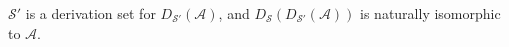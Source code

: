 $\mathcal{S}'$ is a derivation set for $D_{\mathcal{S}'}(\mathcal{A})$, and $D_{\mathcal{S}}(D_{\mathcal{S}'}(\mathcal{A}))$ is naturally isomorphic to $\mathcal{A}$.
